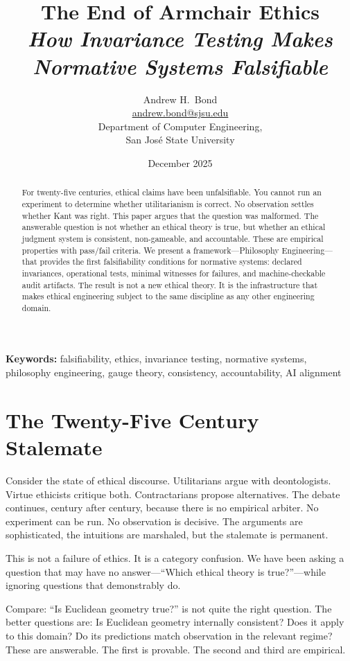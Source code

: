 \documentclass[12pt]{article}
\title{\textbf{The End of Armchair Ethics}\\[0.5em]
\large\textit{How Invariance Testing Makes Normative Systems Falsifiable}}
\author{Andrew H.\ Bond\\
\href{mailto:andrew.bond@sjsu.edu}{andrew.bond@sjsu.edu}\\
Department of Computer Engineering,\\
San Jos\'{e} State University}
\date{December 2025}
\begin{document}
\maketitle

\noindent\textbf{Keywords:} falsifiability, ethics, invariance testing, normative systems,
philosophy engineering, gauge theory, consistency, accountability, AI alignment

\begin{abstract}
For twenty-five centuries, ethical claims have been unfalsifiable. You cannot run an
experiment to determine whether utilitarianism is correct. No observation settles
whether Kant was right. This paper argues that the question was malformed. The
answerable question is not whether an ethical theory is true, but whether an ethical
judgment system is consistent, non-gameable, and accountable. These are empirical
properties with pass/fail criteria. We present a framework---Philosophy
Engineering---that provides the first falsifiability conditions for normative systems:
declared invariances, operational tests, minimal witnesses for failures, and machine-checkable
audit artifacts. The result is not a new ethical theory. It is the
infrastructure that makes ethical engineering subject to the same discipline as any
other engineering domain.
\end{abstract}

\section{The Twenty-Five Century Stalemate}

Consider the state of ethical discourse. Utilitarians argue with deontologists. Virtue
ethicists critique both. Contractarians propose alternatives. The debate continues,
century after century, because there is no empirical arbiter. No experiment can be
run. No observation is decisive. The arguments are sophisticated, the intuitions are
marshaled, but the stalemate is permanent.

This is not a failure of ethics. It is a category confusion. We have been asking a
question that may have no answer---``Which ethical theory is true?''---while ignoring
questions that demonstrably do.

Compare: ``Is Euclidean geometry true?'' is not quite the right question. The better
questions are: Is Euclidean geometry internally consistent? Does it apply to this
domain? Do its predictions match observation in the relevant regime? These are
answerable. The first is provable. The second and third are empirical.
\end{document}
